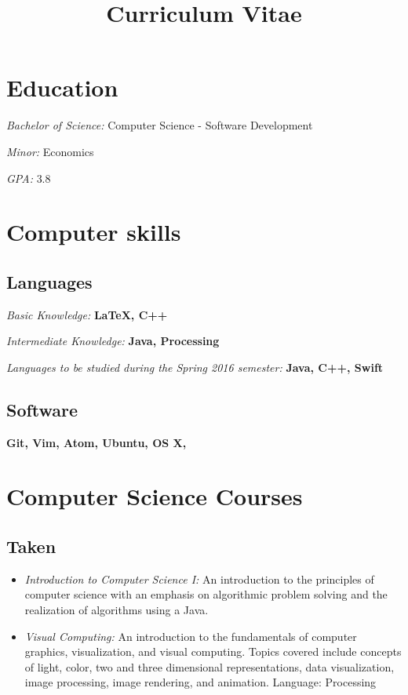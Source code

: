 \documentclass[11pt,a4paper,sans]{moderncv} %
\title{Curriculum Vitae}
\begin{document}
\makecvtitle %

\section{Education}

{\textit{Bachelor of Science: }{Computer Science - Software Development}}

{\textit{Minor: }{Economics}

{\textit{GPA: }{3.8}

\section{Computer skills}

\subsection{Languages}
{\textit{Basic Knowledge: }{\textbf{LaTeX, C++}}}

{\textit{Intermediate Knowledge: }{\textbf{Java, Processing}}}

{\textit{Languages to be studied during the Spring 2016 semester: }{\textbf{Java, C++, Swift}}}

\subsection{Software}
{\textbf{Git, Vim, Atom, Ubuntu, OS X,}}

\section{Computer Science Courses}

\subsection{Taken}
\begin{itemize}
\item {\textit{Introduction to Computer Science I: }{An introduction to the principles of computer science with an emphasis on algorithmic problem solving and the realization of algorithms using a Java.}}
\item{\textit{Visual Computing: }{An introduction to the fundamentals of computer graphics, visualization, and visual computing. Topics covered include concepts of light, color, two and three dimensional representations, data visualization, image processing, image rendering, and animation. Language: Processing}}
\end{itemize}
}}
\end{document}
